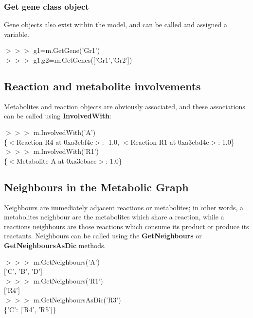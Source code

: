 \subsubsection{Get gene class object}
Gene objects also exist within the model, and can be called and assigned a variable.

\begin{framed}
$>>>$ g1=m.GetGene('Gr1')\\
$>>>$ g1,g2=m.GetGenes(['Gr1','Gr2'])
\end{framed}


\subsection{Reaction and metabolite involvements}

Metabolites and reaction objects are obviously associated, and these associations can be called using \textbf{InvolvedWith}:
\begin{framed}
$>>>$ m.InvolvedWith('A')\\
\{$<$Reaction R4 at 0xa3ebf4c$>$: -1.0, $<$Reaction R1 at 0xa3ebd4c$>$: 1.0\}\\

$>>>$ m.InvolvedWith('R1')\\
\{$<$Metabolite A at 0xa3ebacc$>$: 1.0\}
\end{framed}


\subsection{Neighbours in the Metabolic Graph}

Neighbours are immediately adjacent reactions or metabolites; in other words, a metabolites neighbour are the metabolites which share a reaction, while a reactions neighbours are those reactions which consume its product or produce its reactants. Neighbours can be called using the \textbf{GetNeighbours} or \textbf{GetNeighboursAsDic} methods.

\begin{framed}
$>>>$ m.GetNeighbours('A')\\
$[$'C', 'B', 'D'$]$\\

$>>>$ m.GetNeighbours('R1')\\
$[$'R4'$]$\\

$>>>$ m.GetNeighboursAsDic('R3')\\
\{'C': ['R4', 'R5']\}
\end{framed}

